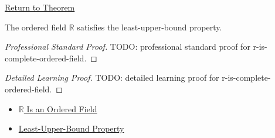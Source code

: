\newpage
{}
\label{prf:r-is-complete-ordered-field}

\begin{remark*}[Return]
\hyperref[thm:r-is-complete-ordered-field]{Return to Theorem}
\end{remark*}

\begin{theorem*}
The ordered field $\mathbb{R}$ satisfies the least-upper-bound property.
\end{theorem*}

\begin{proof}[Professional Standard Proof]
\LRAProofBodyStart
TODO: professional standard proof for r-is-complete-ordered-field.
\end{proof}

\begin{proof}[Detailed Learning Proof]
\LRAProofBodyStart
TODO: detailed learning proof for r-is-complete-ordered-field.
\end{proof}

\begin{remark*}
\end{remark*}

\begin{dependencies}
\begin{itemize}
  \item \hyperref[thm:r-is-an-ordered-field]{$\mathbb{R}$ Is an Ordered Field}
  \item \hyperref[thm:lub-property-r]{Least-Upper-Bound Property}
\end{itemize}
\end{dependencies}

\clearpage
